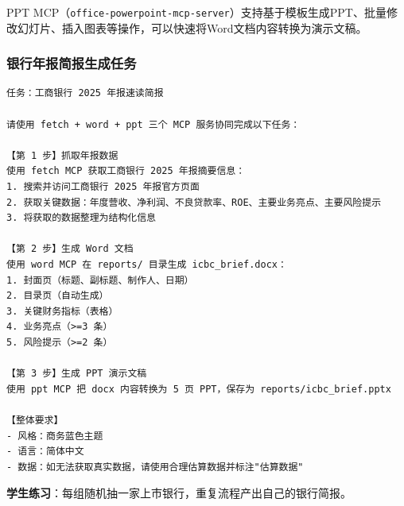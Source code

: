 PPT MCP（\texttt{office-powerpoint-mcp-server}）支持基于模板生成PPT、批量修改幻灯片、插入图表等操作，可以快速将Word文档内容转换为演示文稿。

\subsubsection{银行年报简报生成任务}

\begin{lstlisting}
任务：工商银行 2025 年报速读简报

请使用 fetch + word + ppt 三个 MCP 服务协同完成以下任务：

【第 1 步】抓取年报数据
使用 fetch MCP 获取工商银行 2025 年报摘要信息：
1. 搜索并访问工商银行 2025 年报官方页面
2. 获取关键数据：年度营收、净利润、不良贷款率、ROE、主要业务亮点、主要风险提示
3. 将获取的数据整理为结构化信息

【第 2 步】生成 Word 文档
使用 word MCP 在 reports/ 目录生成 icbc_brief.docx：
1. 封面页（标题、副标题、制作人、日期）
2. 目录页（自动生成）
3. 关键财务指标（表格）
4. 业务亮点（>=3 条）
5. 风险提示（>=2 条）

【第 3 步】生成 PPT 演示文稿
使用 ppt MCP 把 docx 内容转换为 5 页 PPT，保存为 reports/icbc_brief.pptx

【整体要求】
- 风格：商务蓝色主题
- 语言：简体中文
- 数据：如无法获取真实数据，请使用合理估算数据并标注"估算数据"
\end{lstlisting}

\textbf{学生练习}：每组随机抽一家上市银行，重复流程产出自己的银行简报。

